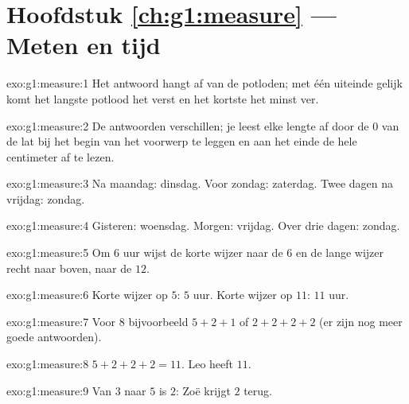 \section*{Hoofdstuk \ref{ch:g1:measure} --- Meten en tijd}

\begin{solution}{exo:g1:measure:1}
Het antwoord hangt af van de potloden; met één uiteinde gelijk komt het
langste potlood het verst en het kortste het minst ver.
\end{solution}

\begin{solution}{exo:g1:measure:2}
De antwoorden verschillen; je leest elke lengte af door de $0$ van de
lat bij het begin van het voorwerp te leggen en aan het einde de hele
centimeter af te lezen.
\end{solution}

\begin{solution}{exo:g1:measure:3}
Na maandag: dinsdag. Voor zondag: zaterdag. Twee dagen na vrijdag:
zondag.
\end{solution}

\begin{solution}{exo:g1:measure:4}
Gisteren: woensdag. Morgen: vrijdag. Over drie dagen: zondag.
\end{solution}

\begin{solution}{exo:g1:measure:5}
Om $6$ uur wijst de korte wijzer naar de $6$ en de lange wijzer recht
naar boven, naar de $12$.
\end{solution}

\begin{solution}{exo:g1:measure:6}
Korte wijzer op $5$: $5$ uur. Korte wijzer op $11$: $11$ uur.
\end{solution}

\begin{solution}{exo:g1:measure:7}
Voor $8$ bijvoorbeeld $5 + 2 + 1$ of $2 + 2 + 2 + 2$ (er zijn nog meer
goede antwoorden).
\end{solution}

\begin{solution}{exo:g1:measure:8}
$5 + 2 + 2 + 2 = 11$. Leo heeft $11$.
\end{solution}

\begin{solution}{exo:g1:measure:9}
Van $3$ naar $5$ is $2$: Zoë krijgt $2$ terug.
\end{solution}
